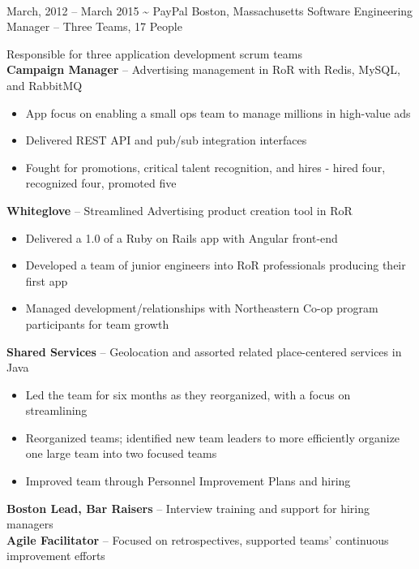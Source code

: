 \documentclass[print]{friggeri-cv}
\begin{document}
\begin{entrylist}
  \\[1cm]%
  \entryalt
    {March, 2012 -- March 2015}
    {\textbf{\textasciitilde} PayPal}
    {Boston, Massachusetts}
    {Software Engineering Manager -- Three Teams, 17 People}
    {Responsible for three application development scrum teams \\
      \textbf{Campaign Manager} -- Advertising management in RoR with Redis, MySQL,
      and RabbitMQ
    \begin{itemize}
      \item App focus on enabling a small ops team to manage millions in
        high-value ads
      \item Delivered REST API and pub/sub integration interfaces
      \item Fought for promotions, critical talent recognition, and hires - hired four, recognized four, promoted five
    \end{itemize}
      \textbf{Whiteglove} -- Streamlined Advertising product creation tool in RoR
    \begin{itemize}
      \item Delivered a 1.0 of a Ruby on Rails app with Angular front-end
      \item Developed a team of junior engineers into RoR professionals producing their first app
      \item Managed development/relationships with Northeastern Co-op program
        participants for team growth
    \end{itemize} 
      \textbf{Shared Services} -- Geolocation and assorted related place-centered
      services in Java
    \begin{itemize}
      \item Led the team for six months as they reorganized, with a focus on
        streamlining
      \item Reorganized teams; identified new team leaders to more efficiently organize one large team into two focused teams
      \item Improved team through Personnel Improvement Plans and hiring
    \end{itemize}
    \textbf{Boston Lead, Bar Raisers} -- Interview training and support for hiring managers\\
    \textbf{Agile Facilitator} -- Focused on retrospectives, supported teams' continuous improvement efforts}


\end{entrylist}
\end{document}

